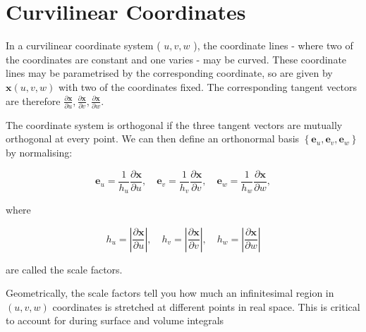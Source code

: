\section{Curvilinear Coordinates}

\begin{ndefi}
	In a curvilinear coordinate system ( $u, v, w$ ), the coordinate lines - where two of the coordinates are constant and one varies - may be curved. These coordinate lines may be parametrised by the corresponding coordinate, so are given by $\boldsymbol{x}(u, v, w)$ with two of the coordinates fixed. The corresponding tangent vectors are therefore $\frac{\partial \boldsymbol{x}}{\partial u}, \frac{\partial \boldsymbol{x}}{\partial v}, \frac{\partial \boldsymbol{x}}{\partial w}$.
\end{ndefi}

\begin{ndefi}
	The coordinate system is orthogonal if the three tangent vectors are mutually orthogonal at every point. We can then define an orthonormal basis $\left\{\boldsymbol{e}_u, \boldsymbol{e}_v, \boldsymbol{e}_w\right\}$ by normalising:
	
	$$
	\boldsymbol{e}_u=\frac{1}{h_u} \frac{\partial \boldsymbol{x}}{\partial u}, \quad \boldsymbol{e}_v=\frac{1}{h_v} \frac{\partial \boldsymbol{x}}{\partial v}, \quad \boldsymbol{e}_w=\frac{1}{h_w} \frac{\partial \boldsymbol{x}}{\partial w},
	$$
	
	where
	
	$$
	h_u=\left|\frac{\partial \boldsymbol{x}}{\partial u}\right|, \quad h_v=\left|\frac{\partial \boldsymbol{x}}{\partial v}\right|, \quad h_w=\left|\frac{\partial \boldsymbol{x}}{\partial w}\right|
	$$
	
	are called the scale factors.
\end{ndefi}

\begin{nrem}
	Geometrically, the scale factors tell you how much an infinitesimal region in $(u, v, w)$ coordinates is stretched at different points in real space. This is critical to account for during surface and volume integrals
\end{nrem}

